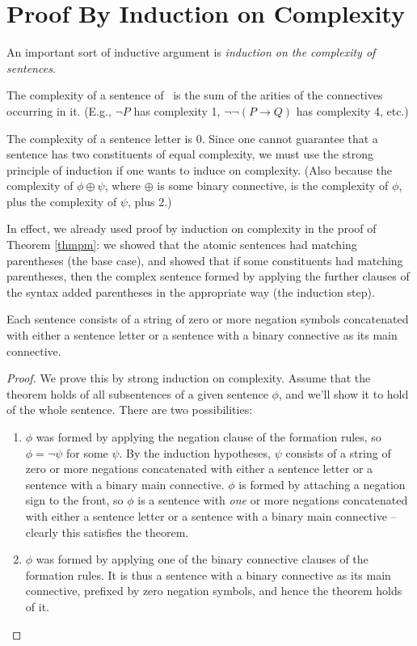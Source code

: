 \section{Proof By Induction on Complexity}

An important sort of inductive argument is \emph{induction on the complexity of sentences}.
\begin{definition}[Complexity]
	The complexity of a sentence of \lone\ is the sum of the arities of the connectives occurring in it. (E.g., $\neg P$ has complexity 1, $\neg\neg(P \to Q)$ has complexity 4, etc.)
\end{definition}
The complexity of a sentence letter is 0. Since one cannot guarantee that a sentence has two constituents of equal complexity, we must use the strong principle of induction if one wants to induce on complexity. (Also because the complexity of $\phi \oplus \psi$, where $\oplus$ is some binary connective, is the complexity of $\phi$, plus the complexity of $\psi$, plus 2.) 

In effect, we already used proof by induction on complexity in the proof of Theorem \ref{thmpm}: we showed that the atomic sentences had matching parentheses (the base case), and showed that if some constituents had matching parentheses, then the complex sentence formed by applying the further clauses of the syntax added parentheses in the appropriate way (the induction step). 

\begin{theorem}
Each sentence consists of a string of zero or more negation symbols concatenated with either a sentence letter or a sentence with a binary connective as its main connective.
\begin{proof}
	We prove this by strong induction on complexity. Assume that the theorem holds of all subsentences of a given sentence $\phi$, and we'll show it to hold of the whole sentence. There are two possibilities: \begin{enumerate}
		\item $\phi$ was formed by applying the negation clause of the formation rules, so $\phi = \neg\psi$ for some $\psi$. By the induction hypotheses, $\psi$ consists of a string of zero or more negations concatenated with either a sentence letter or a sentence with a binary main connective. $\phi$ is formed by attaching a negation sign to the front, so $\phi$ is a sentence with \emph{one} or more negations concatenated with either a sentence letter or a sentence with a binary main connective – clearly this satisfies the theorem.
		\item $\phi$ was formed by applying one of the binary connective clauses of the formation rules. It is thus a sentence with a binary connective as its main connective, prefixed by zero negation symbols, and hence the theorem holds of it.
	\end{enumerate}	
\end{proof}\end{theorem}



